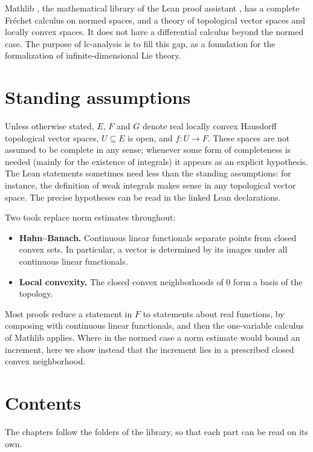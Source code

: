 Mathlib \cite{mC20}, the mathematical library of the Lean proof assistant \cite{dMU21}, has a
complete Fréchet calculus on normed spaces, and a theory of topological vector spaces and
locally convex spaces. It does not have a differential calculus beyond the normed case. The
purpose of lc-analysis is to fill this gap, as a foundation for the formalization of
infinite-dimensional Lie theory.

\section*{Standing assumptions}

Unless otherwise stated, $E$, $F$ and $G$ denote real locally convex Hausdorff topological
vector spaces, $U \subseteq E$ is open, and $f \colon U \to F$. These spaces are not assumed to
be complete in any sense; whenever some form of completeness is needed (mainly for the
existence of integrals) it appears as an explicit hypothesis. The Lean statements sometimes
need less than the standing assumptions: for instance, the definition of weak integrals makes
sense in any topological vector space. The precise hypotheses can be read in the linked Lean
declarations.

Two tools replace norm estimates throughout:
\begin{itemize}
  \item \textbf{Hahn--Banach.} Continuous linear functionals separate points from closed convex
  sets. In particular, a vector is determined by its images under all continuous linear
  functionals.
  \item \textbf{Local convexity.} The closed convex neighborhoods of $0$ form a basis of the
  topology.
\end{itemize}
Most proofs reduce a statement in $F$ to statements about real functions, by composing with
continuous linear functionals, and then the one-variable calculus of Mathlib applies. Where in
the normed case a norm estimate would bound an increment, here we show instead that the
increment lies in a prescribed closed convex neighborhood.

\section*{Contents}

The chapters follow the folders of the library, so that each part can be read on its own.

